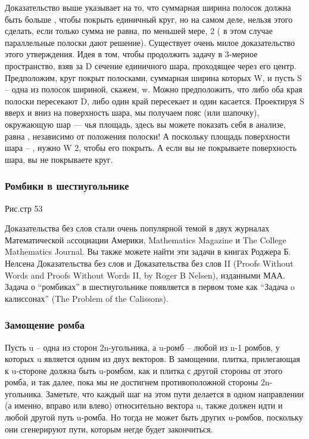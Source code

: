 Доказательство выше указывает на то, что суммарная ширина полосок должна быть больше , чтобы покрыть единичный круг, но на самом деле, нельзя этого сделать, если только сумма не равна, по меньшей мере, 2 ( в этом случае параллельные полоски дают решение).
Существует очень милое доказательство этого утверждения.
Идея в том, чтобы продолжить задачу в 3-мерное пространство, взяв за D сечение единичного шара, проходящее через его центр.
Предположим, круг покрыт полосками, суммарная ширина которых W, и пусть S -- одна из полосок шириной, скажем, w.
Можно предположить, что либо оба края полоски пересекают D, либо один край пересекает и один касается.
Проектируя S вверх и вниз на поверхность шара, мы получаем пояс (или шапочку),
окружающую шар --- чья площадь, здесь вы можете показать себя в анализе, равна 
, независимо от положения полоски!
А поскольку площадь поверхности шара -- , нужно W 2, чтобы его покрыть.
А если вы не покрываете поверхность шара, вы не покрываете круг.

\subsubsection*{Ромбики в шестиугольнике}%


Рис.стр 53

Доказательства без слов стали очень популярной темой в двух журналах Математической aссоциации Америки, Mathematics Magazine и The College Mathematics Journal.
Вы также можете найти эти задачи в книгах Роджера Б.
Нелсена Доказательства без слов и Доказательства без слов II (Proofs Without Words and Proofs Without Words II, by Roger B Nelsen), изданными МАА.
Задача о “ромбиках” в шестиугольнике появляется в первом томе как “Задача o калиссонах” (The Problem of the Calissons).

\subsubsection*{Замощение ромба}%

Пусть u -- одна из сторон 2n-угольника, а u-ромб -- любой из n-1 ромбов, у которых u является одним из двух векторов.
В замощении, плитка, прилегающая к u-стороне должна быть u-ромбом, как и плитка с другой стороны от этого ромба, и так далее, пока мы не достигнем противоположной стороны 2n-угольника.
Заметьте, что каждый шаг на этом пути делается в одном направлении (а именно, вправо или влево) относительно вектора u, также должен идти и любой другой путь u-ромба.
Но тогда не может быть других u-ромбов, поскольку они сгенерируют пути, которым негде будет закончиться.

